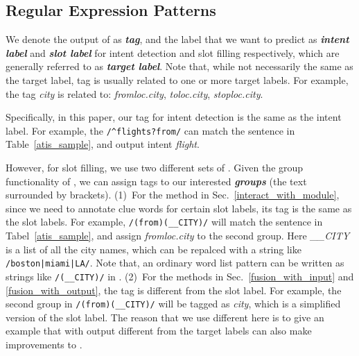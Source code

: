 \subsection{Regular Expression Patterns}
\label{re_desc}
We denote the output of \RE as \textbf{\emph{\RE tag}}, and the label that we want to predict as \textbf{\emph{intent label}} and \textbf{\emph{slot label}} for intent detection and slot filling respectively, which are generally referred to as \textbf{\emph{target label}}.
Note that, while not necessarily the same as the target label, \RE tag is usually related to one or more target labels. For example, the \RE tag \emph{city} is related to: \emph{fromloc.city}, \emph{toloc.city}, \emph{stoploc.city}.

Specifically, in this paper, our \RE tag for intent detection is the same as the intent label. For example, the \RE
\texttt{/\textasciicircum flights?\:from/} can match the sentence in Table~\ref{atis_sample}, and output intent \emph{flight}.

However, for slot filling, we use two different sets of \REs.
Given the group functionality of \RE, we can assign tags to our interested \textbf{\emph{\RE groups}} (the text surrounded by brackets).
(1)~For the method in Sec.~\ref{interact_with_module}, since we need to annotate clue words for certain slot labels, its \RE tag is the same as the slot labels.
For example, \texttt{/(from)\:(\_\_CITY)/} will match the sentence in Tabel~\ref{atis_sample}, and assign \emph{fromloc.city} to the second \RE group.
Here \emph{\_\_CITY} is a list of all the city names, which can be repalced with a string like \texttt{/boston|miami|LA/}.
Note that, an ordinary word list pattern can be written as strings like \texttt{/(\_\_CITY)/} in \RE.
(2)~For the methods in Sec.~\ref{fusion_with_input} and \ref{fusion_with_output}, the \RE tag is different from the slot label. For example, the second \RE group in \texttt{/(from)\:(\_\_CITY)/} will be tagged as \emph{city}, which is a simplified version of the slot label. The reason that we use different \REs here is to give an example that \REs with output different from the target labels can also make improvements to \NN.


